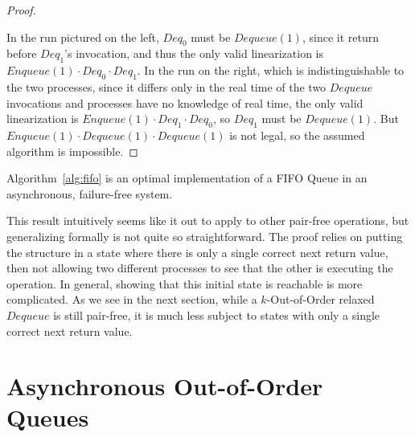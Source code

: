\documentclass[a4paper,anonymous,USenglish]{lipics-v2021}
\theoremstyle{definition}
\begin{document}
\begin{proof}
\begin{center}
  \end{center}
  In the run pictured on the left, $Deq_0$ must be $Dequeue(1)$, since it return before $Deq_1$'s invocation, and thus the only valid linearization is $Enqueue(1) \cdot Deq_0 \cdot Deq_1$.  In the run on the right, which is indistinguishable to the two processes, since it differs only in the real time of the two $Dequeue$ invocations and processes have no knowledge of real time, the only valid linearization is $Enqueue(1) \cdot Deq_1 \cdot Deq_0$, so $Deq_1$ must be $Dequeue(1)$.  But $Enqueue(1) \cdot Dequeue(1) \cdot Dequeue(1)$ is not legal, so the assumed algorithm is impossible.  
\end{proof}

\begin{theorem}
  Algorithm~\ref{alg:fifo} is an optimal implementation of a FIFO Queue in an asynchronous, failure-free system.
\end{theorem}

This result intuitively seems like it out to apply to other pair-free operations, but generalizing formally is not quite so straightforward.  The proof relies on putting the structure in a state where there is only a single correct next return value, then not allowing two different processes to see that the other is executing the operation.  In general, showing that this initial state is reachable is more complicated.  As we see in the next section, while a $k$-Out-of-Order relaxed $Dequeue$ is still pair-free, it is much less subject to states with only a single correct next return value.   

  
\section{Asynchronous Out-of-Order Queues}
\end{document}
